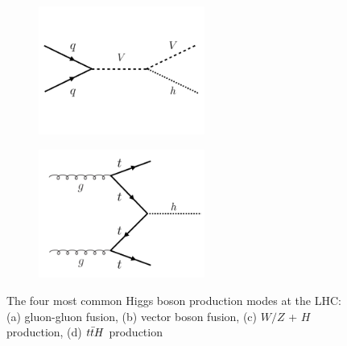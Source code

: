 \begin{figure}[h!]
    \begin{subfigure}[t]{0.5\textwidth}
        \centering
        \includegraphics[width=0.6\textwidth]{figures/V_higgs}
        \caption{}
    \end{subfigure}%
    \begin{subfigure}[t]{0.5\textwidth}
        \centering
        \includegraphics[width=0.6\textwidth]{figures/ttH}
        \caption{}
    \end{subfigure}

   \caption{The four most common Higgs boson production modes at the LHC: (a) gluon-gluon fusion, (b) vector boson fusion, (c) $W/Z$ + $H$ production, (d) $t\bar{t} H$ production}
  \label{fig:production_modes}
\end{figure}

